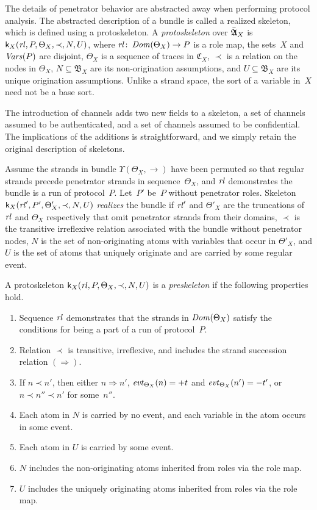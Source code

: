 \documentclass[12pt]{report}
\theoremstyle{definition}
\newcommand{\algbara}{\bar{\alg{A}}}
\newcommand{\tr}{\ensuremath{\mathfrak C}}
\newcommand{\base}{\ensuremath{\mathfrak B}}
\newcommand{\sdom}{\fn{Dom}}
\newcommand{\svars}{\fn{Vars}}
\newcommand{\evt}{\fn{evt}}
\newcommand{\skel}{\mathsf{k}}
\newcommand{\rl}{\fn{rl}}
\begin{document}
The details of penetrator behavior are abstracted away when performing
protocol analysis.  The abstracted description of a bundle is called a
realized skeleton, which is defined using a protoskeleton.  A
\emph{protoskeleton} over $\algbara_X$ is
$\skel_X(\rl,P,\Theta_X,\prec,N,U)$, where $\rl\colon\sdom(\Theta_X)\to P$ is
a role map, the sets~$X$ and $\svars(P)$ are disjoint,
$\Theta_X$ is a sequence of traces in $\tr_X$, $\prec$ is a relation
on the nodes in $\Theta_X$, $N\subseteq\base_X$ are its
non-origination assumptions, and $U\subseteq\base_X$ are its unique
origination assumptions.  Unlike a strand space, the sort of a
variable in~$X$ need not be a base sort.

The introduction of channels adds two new fields to a skeleton, a set
of channels assumed to be authenticated, and a set of channels assumed
to be confidential.  The implications of the additions is
straightforward, and we simply retain the original description of
skeletons.

Assume the strands in bundle $\Upsilon(\Theta_X,\to)$ have been
permuted so that regular strands precede penetrator strands in
sequence~$\Theta_X$, and $\rl$ demonstrates the bundle is a run of
protocol~$P$.  Let~$P'$ be~$P$ without penetrator roles.  Skeleton
$\skel_X(\rl',P',\Theta'_X,\prec,N,U)$ \emph{realizes} the bundle if
$\rl'$ and $\Theta'_X$ are the truncations of $\rl$ and $\Theta_X$
respectively that omit penetrator strands from their domains, $\prec$
is the transitive irreflexive relation associated with the bundle
without penetrator nodes, $N$ is the set of non-originating atoms with
variables that occur in $\Theta'_X$, and $U$ is the set of atoms that
uniquely originate and are carried by some regular event.

A protoskeleton $\skel_X(\rl,P,\Theta_X,\prec,N,U)$ is a
\emph{preskeleton} if the following properties hold.
\begin{enumerate}
\item Sequence $\rl$ demonstrates that the strands in $\sdom(\Theta_X)$
  satisfy the conditions for being a part of a run of protocol~$P$.
\item Relation $\prec$ is transitive, irreflexive, and includes the
  strand succession relation $(\Rightarrow)$.
\item If $n\prec n'$, then either $n\Rightarrow n'$,
  $\evt_{\Theta_X}(n)=\outbnd t$ and   $\evt_{\Theta_X}(n')=\inbnd
  t'$, or $n\prec n''\prec n'$ for some~$n''$.
\item Each atom in $N$ is carried by no event, and each variable
  in the atom occurs in some event.
\item Each atom in $U$ is carried by some event.
\item $N$ includes the non-originating atoms inherited from roles via
  the role map.
\item $U$ includes the uniquely originating atoms inherited from roles via
  the role map.
\end{enumerate}
\end{document}
